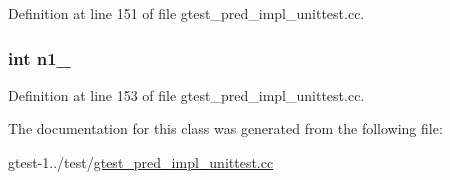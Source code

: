 \-Definition at line 151 of file gtest\-\_\-pred\-\_\-impl\-\_\-unittest.\-cc.

\hypertarget{classPredicate1Test_a7a61c539c18d10f12696fc25b115d699}{
\subsubsection[{n1\-\_\-}]{\setlength{\rightskip}{0pt plus 5cm}int {\bf n1\-\_\-}}}\label{da/d9a/classPredicate1Test_a7a61c539c18d10f12696fc25b115d699}


\-Definition at line 153 of file gtest\-\_\-pred\-\_\-impl\-\_\-unittest.\-cc.



\-The documentation for this class was generated from the following file\-:\begin{DoxyCompactItemize}
\item 
gtest-\/1../test/\hyperlink{gtest__pred__impl__unittest_8cc}{gtest\-\_\-pred\-\_\-impl\-\_\-unittest.\-cc}\end{DoxyCompactItemize}

